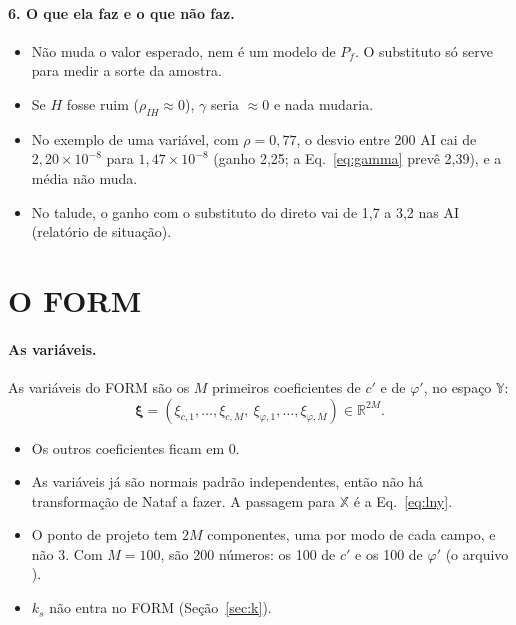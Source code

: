 \documentclass[11pt,a4paper]{article}
\newcommand{\X}{\mathbb{X}}
\newcommand{\Y}{\mathbb{Y}}
\newcommand{\xib}{\bm\xi}
\begin{document}
\paragraph{6. O que ela faz e o que não faz.}
\begin{itemize}
  \item Não muda o valor esperado, nem é um modelo de $P_f$. O substituto só serve para medir a sorte da amostra.
  \item Se $H$ fosse ruim ($\rho_{IH} \approx 0$), $\gamma$ seria $\approx 0$ e nada mudaria.
  \item No exemplo de uma variável, com $\rho = 0{,}77$, o desvio entre 200 AI cai de $2{,}20\times10^{-8}$ para
    $1{,}47\times10^{-8}$ (ganho 2,25; a Eq.~\eqref{eq:gamma} prevê 2,39), e a média não muda.
  \item No talude, o ganho com o substituto do direto vai de 1,7 a 3,2 nas AI (relatório de situação).
\end{itemize}

\section{O FORM}\label{sec:form}
\paragraph{As variáveis.} As variáveis do FORM são os $M$ primeiros coeficientes de $c'$ e de $\varphi'$, no espaço
$\Y$:
\begin{equation}
  \xib = (\xi_{c,1}, \dots, \xi_{c,M},\ \xi_{\varphi,1}, \dots, \xi_{\varphi,M}) \in \mathbb R^{2M}.
  \label{eq:yform}
\end{equation}
\begin{itemize}
  \item Os outros coeficientes ficam em 0.
  \item As variáveis já são normais padrão independentes, então não há transformação de Nataf a fazer. A passagem para
    $\X$ é a Eq.~\eqref{eq:lny}.
  \item O ponto de projeto tem $2M$ componentes, uma por modo de cada campo, e não 3. Com $M = 100$, são 200 números:
    os 100 de $c'$ e os 100 de $\varphi'$ (o arquivo ).
  \item $k_s$ não entra no FORM (Seção~\ref{sec:k}).
\end{itemize}
\end{document}
